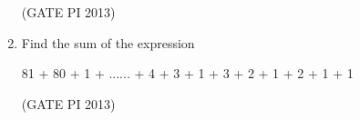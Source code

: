 \documentclass[journal,12pt,onecolumn]{IEEEtran}
\theoremstyle{remark}
\begin{document}
\begin{enumerate}
\hfill (GATE PI 2013)

\item Find the sum of the expression  

81 + 80 + 1 + ...... + 4 + 3 + 1 + 3 + 2 + 1 + 2 + 1 + 1
\begin{enumerate}
\end{enumerate}

\hfill (GATE PI 2013)
\end{enumerate}
\end{document}
